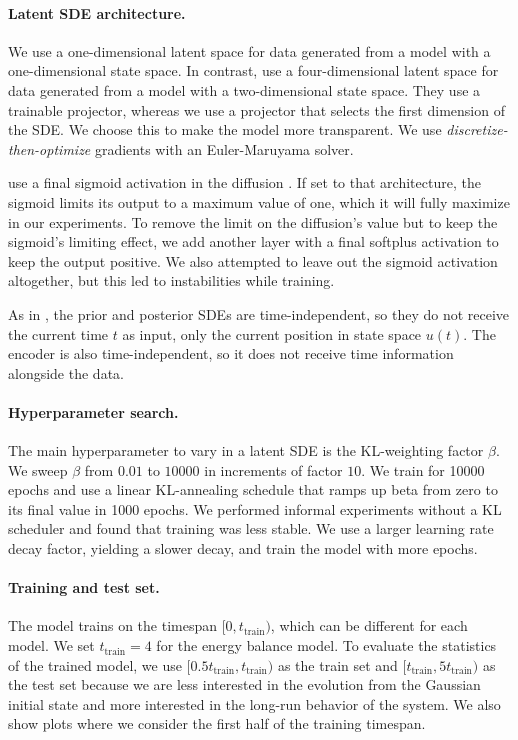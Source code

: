 \documentclass[twoside,11pt]{article}
\begin{document}
\paragraph{Latent SDE architecture.}
We use a one-dimensional latent space for data generated from a model with a one-dimensional state space. In contrast, \cite{li2020scalable} use a four-dimensional latent space for data generated from a model with a two-dimensional state space. They use a trainable projector, whereas we use a projector that selects the first dimension of the SDE. We choose this to make the model more transparent. We use \textit{discretize-then-optimize} gradients \cite[cf.]{kidgerefficient} with an Euler-Maruyama solver.

\citeauthor{li2020scalable} use a final sigmoid activation in the diffusion \cite{li2020scalable}. If set to that architecture, the sigmoid limits its output to a maximum value of one, which it will fully maximize in our experiments. To remove the limit on the diffusion's value but to keep the sigmoid's limiting effect, we add another layer with a final softplus activation to keep the output positive. We also attempted to leave out the sigmoid activation altogether, but this led to instabilities while training.

As in \cite{li2020scalable}, the prior and posterior SDEs are time-independent, so they do not receive the current time \(t\) as input, only the current position in state space \(u(t)\). The encoder is also time-independent, so it does not receive time information alongside the data.

\paragraph{Hyperparameter search.}
The main hyperparameter to vary in a latent SDE is the KL-weighting factor \(\beta\). We sweep \(\beta\) from \(0.01\) to \(10000\) in increments of factor \(10\). We train for 10000 epochs and use a linear KL-annealing schedule \cite{fu2019cyclical} that ramps up beta from zero to its final value in 1000 epochs. We performed informal experiments without a KL scheduler and found that training was less stable. We use a larger learning rate decay factor, yielding a slower decay, and train the model with more epochs.

\paragraph{Training and test set.}
The model trains on the timespan \([0, t_{\text{train}})\), which can be different for each model. We set \(t_{\text{train}} = 4\) for the energy balance model. To evaluate the statistics of the trained model, we use \([0.5 t_{\text{train}}, t_{\text{train}})\) as the train set and \([t_{\text{train}}, 5 t_{\text{train}})\) as the test set because we are less interested in the evolution from the Gaussian initial state and more interested in the long-run behavior of the system. We also show plots where we consider the first half of the training timespan.
\end{document}
